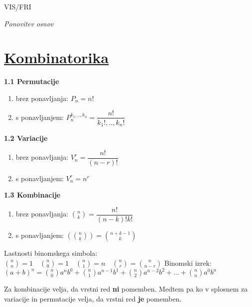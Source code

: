 \documentclass{article}
\begin{document}
\begin{center}
    {\small VIS/FRI \par}
\end{center}

\begin{multicols}{3}

\textit{Ponovitev osnov}

\section{\underline{Kombinatorika}}


\textbf{1.1 Permutacije}
\begin{enumerate}
    \item brez ponavljanja: $P_{n} = n!$
    \item s ponavljanjem: $P_{n}^{k_{1},..,k_{n}} = \dfrac{n!}{k_{1}!,..,k_{n}!}$
\end{enumerate}

\textbf{1.2 Variacije}
\begin{enumerate}
    \item brez ponavljanja: $V_{n}^{r} = \dfrac{n!}{(n - r)!}$
    \item s ponavljanjem: $V_{n}^{r} = n^{r}$
\end{enumerate}

\textbf{1.3 Kombinacije}
\begin{enumerate}
    \item brez ponavljanja: ${n\choose k} = \dfrac{n!}{(n - k)! k!}$
    \item s ponavljanjem: $({n\choose k}) = {n + k - 1\choose k}$
\end{enumerate}
\begin{center}
    Lastnosti binomskega simbola:
    \begin{math}
        {n \choose n} = 1 \quad
        {n \choose 0} = 1 \quad
        {n \choose 1} = n \quad
        {n \choose r} = {n \choose n - r} 
    \end{math}
    Binomski izrek:\\
    \begin{math}
        (a + b)^{n} =
        {n \choose 0} a^{n} b^{0} + {n \choose 1} a^{n - 1} b^{1} +
        {n \choose 2} a^{n - 2} b^{2} + \dots + {n \choose n} a^{0} b^{n}
    \end{math}

\end{center}
Za kombinacije velja, da vrstni red \textbf{ni} pomemben. Medtem pa
ko v splosnem za variacije in permutacije velja, da vrstni red \textbf{je}
pomemben.


\end{multicols}
\end{document}
